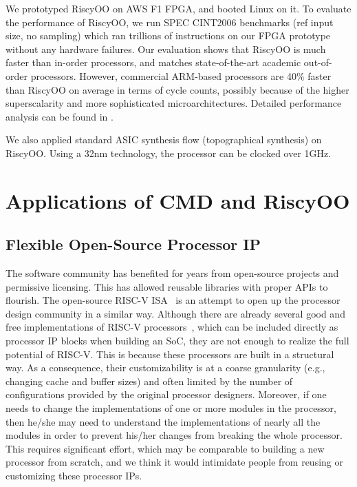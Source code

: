 \documentclass[conference]{IEEEtran}
\begin{document}
We prototyped RiscyOO on AWS F1 FPGA, and booted Linux on it.
To evaluate the performance of RiscyOO, we run SPEC CINT2006 benchmarks (ref input size, no sampling) which ran trillions of instructions on our FPGA prototype without any hardware failures.
Our evaluation shows that RiscyOO is much faster than in-order processors, and matches state-of-the-art academic out-of-order processors.
However, commercial ARM-based processors are 40\% faster than RiscyOO on average in terms of cycle counts, possibly because of the higher superscalarity and more sophisticated microarchitectures.
Detailed performance analysis can be found in \cite{riscyoo}.

We also applied standard ASIC synthesis flow (topographical synthesis) on RiscyOO.
Using a 32nm technology, the processor can be clocked over 1GHz.


\section{Applications of CMD and RiscyOO}\label{sec:app}

\subsection{Flexible Open-Source Processor IP}
The software community has benefited for years from open-source projects and permissive licensing. 
This has allowed reusable libraries with proper APIs to flourish. 
The open-source RISC-V ISA~\cite{riscv} is an attempt to open up the processor design community in a similar way.
Although there are already several good and free implementations of RISC-V processors~\cite{rocketchip,boom,pulp}, which can be included directly as processor IP blocks when building an SoC, they are not enough to realize the full potential of RISC-V.
This is because these processors are built in a structural way.
As a consequence, their customizability is at a coarse granularity (e.g., changing cache and buffer sizes) and often limited by the number of configurations provided by the original processor designers.
Moreover, if one needs to change the implementations of one or more modules in the processor, then he/she may need to understand the implementations of nearly all the modules in order to prevent his/her changes from breaking the whole processor.
This requires significant effort, which may be comparable to building a new processor from scratch, and we think it would intimidate people from reusing or customizing these processor IPs.
\end{document}

